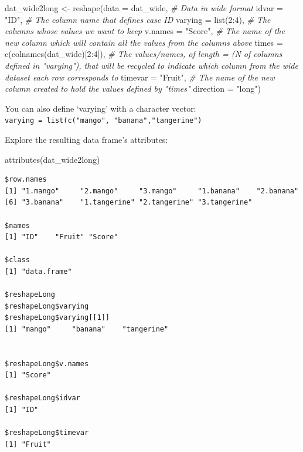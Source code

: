 \documentclass[
]{book}
\newenvironment{Shaded}{\begin{snugshade}}{\end{snugshade}}
\newcommand{\AttributeTok}[1]{\textcolor[rgb]{0.77,0.63,0.00}{#1}}
\newcommand{\CommentTok}[1]{\textcolor[rgb]{0.56,0.35,0.01}{\textit{#1}}}
\newcommand{\DecValTok}[1]{\textcolor[rgb]{0.00,0.00,0.81}{#1}}
\newcommand{\FunctionTok}[1]{\textcolor[rgb]{0.00,0.00,0.00}{#1}}
\newcommand{\NormalTok}[1]{#1}
\newcommand{\OtherTok}[1]{\textcolor[rgb]{0.56,0.35,0.01}{#1}}
\newcommand{\SpecialCharTok}[1]{\textcolor[rgb]{0.00,0.00,0.00}{#1}}
\newcommand{\StringTok}[1]{\textcolor[rgb]{0.31,0.60,0.02}{#1}}
\begin{document}
\begin{Shaded}
\begin{Highlighting}[]
\NormalTok{dat\_wide2long }\OtherTok{\textless{}{-}} \FunctionTok{reshape}\NormalTok{(}\AttributeTok{data =}\NormalTok{ dat\_wide,                    }\CommentTok{\# Data in wide format}
                         \AttributeTok{idvar =} \StringTok{"ID"}\NormalTok{,                       }\CommentTok{\# The column name that defines case ID}
                         \AttributeTok{varying =} \FunctionTok{list}\NormalTok{(}\DecValTok{2}\SpecialCharTok{:}\DecValTok{4}\NormalTok{),                }\CommentTok{\# The columns whose values we want to keep}
                         \AttributeTok{v.names =} \StringTok{"Score"}\NormalTok{,                  }\CommentTok{\# The name of the new column which will contain all the values from the columns above}
                         \AttributeTok{times =} \FunctionTok{c}\NormalTok{(}\FunctionTok{colnames}\NormalTok{(dat\_wide)[}\DecValTok{2}\SpecialCharTok{:}\DecValTok{4}\NormalTok{]), }\CommentTok{\# The values/names, of length = (N of columns defined in "varying"), that will be recycled to indicate which column from the wide dataset each row corresponds to}
                         \AttributeTok{timevar =} \StringTok{"Fruit"}\NormalTok{,                  }\CommentTok{\# The name of the new column created to hold the values defined by "times"}
                         \AttributeTok{direction =} \StringTok{"long"}\NormalTok{) }
\end{Highlighting}
\end{Shaded}

You can also define `varying' with a character vector:\\
\texttt{varying\ =\ list(c("mango",\ "banana","tangerine")}

Explore the resulting data frame's attributes:

\begin{Shaded}
\begin{Highlighting}[]
\FunctionTok{attributes}\NormalTok{(dat\_wide2long)}
\end{Highlighting}
\end{Shaded}

\begin{verbatim}
$row.names
[1] "1.mango"     "2.mango"     "3.mango"     "1.banana"    "2.banana"   
[6] "3.banana"    "1.tangerine" "2.tangerine" "3.tangerine"

$names
[1] "ID"    "Fruit" "Score"

$class
[1] "data.frame"

$reshapeLong
$reshapeLong$varying
$reshapeLong$varying[[1]]
[1] "mango"     "banana"    "tangerine"


$reshapeLong$v.names
[1] "Score"

$reshapeLong$idvar
[1] "ID"

$reshapeLong$timevar
[1] "Fruit"
\end{verbatim}
\end{document}
